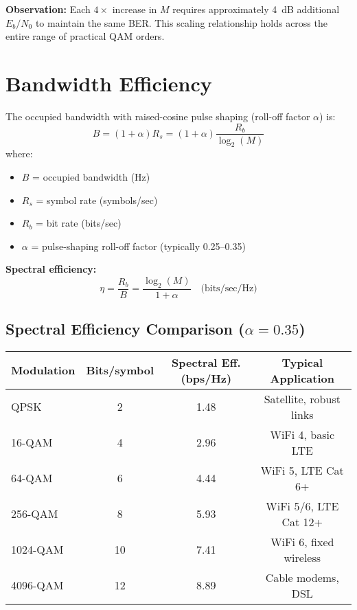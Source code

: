 \textbf{Observation:} Each $4\times$ increase in $M$ requires approximately 4~dB additional $E_b/N_0$ to maintain the same BER. This scaling relationship holds across the entire range of practical QAM orders.

\section{Bandwidth Efficiency}

The occupied bandwidth with raised-cosine pulse shaping (roll-off factor $\alpha$) is:
\begin{equation}
B = (1 + \alpha) R_s = (1 + \alpha) \frac{R_b}{\log_2(M)}
\label{eq:qam-bandwidth}
\end{equation}
where:
\begin{itemize}
\item $B$ = occupied bandwidth (Hz)
\item $R_s$ = symbol rate (symbols/sec)
\item $R_b$ = bit rate (bits/sec)
\item $\alpha$ = pulse-shaping roll-off factor (typically 0.25--0.35)
\end{itemize}

\textbf{Spectral efficiency:}
\begin{equation}
\eta = \frac{R_b}{B} = \frac{\log_2(M)}{1 + \alpha} \quad\text{(bits/sec/Hz)}
\label{eq:qam-spectral-eff}
\end{equation}

\subsection{Spectral Efficiency Comparison ($\alpha = 0.35$)}

\begin{center}
\begin{tabular}{@{}lccc@{}}
\toprule
Modulation & Bits/symbol & Spectral Eff. (bps/Hz) & Typical Application \\
\midrule
QPSK & 2 & 1.48 & Satellite, robust links \\
16-QAM & 4 & 2.96 & WiFi 4, basic LTE \\
64-QAM & 6 & 4.44 & WiFi 5, LTE Cat 6+ \\
256-QAM & 8 & 5.93 & WiFi 5/6, LTE Cat 12+ \\
1024-QAM & 10 & 7.41 & WiFi 6, fixed wireless \\
4096-QAM & 12 & 8.89 & Cable modems, DSL \\
\bottomrule
\end{tabular}
\end{center}

